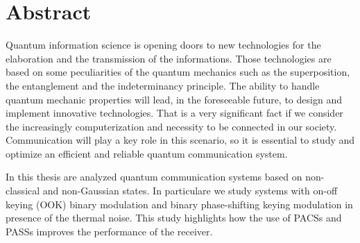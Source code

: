 
\chapter*{Abstract}
    Quantum information science is opening doors to new technologies for the elaboration and the transmission
    of the informations.
    Those technologies are based on some peculiarities of the quantum mechanics such as the superposition,
    the entanglement and the indeterminancy principle.
    The ability to handle quantum mechanic properties will lead, in the foreseeable future, to design
    and implement innovative technologies.
    That is a very significant fact if we consider the increasingly computerization and necessity to be
    connected in our society.
    Communication will play a key role in this scenario, so it is essential to study and optimize an
    efficient and reliable quantum communication system.

    In this thesis are analyzed quantum communication systems based on non-classical and non-Gaussian
    states. In particulare we study systems with on-off keying (OOK) binary modulation and binary
    phase-shifting keying modulation in presence of the thermal noise. This study highlights how the use 
    of PACSs and PASSs improves the performance of the receiver.